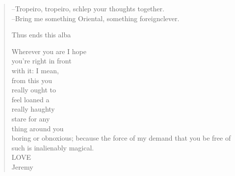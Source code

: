 \documentclass[oneside, 11pt, twocolumn]{book}
\newcounter{secnum}
\newcommand{\secdiv}{
	\vspace{1em}
	\stepcounter{secnum}
	\thesecnum
	\vspace{1em}
}
\begin{document}
\begin{verse}

\hfill--Tropeiro, tropeiro, schlep your thoughts together. \\
\hfill--Bring me something Oriental, something foreignclever.


\secdiv

 



\newpage



\newpage



\newpage



Thus ends this alba

Wherever you are I hope \\
you're right in front \\ 
with it: I mean, \\
from this you \\
really ought to \\
feel loaned a \\
really haughty \\
stare for any \\
thing around you \\
boring or obnoxious; because the force of my demand that you be free of such is inalienably magical. \\
LOVE \\
Jeremy

\end{verse}
\end{document}
